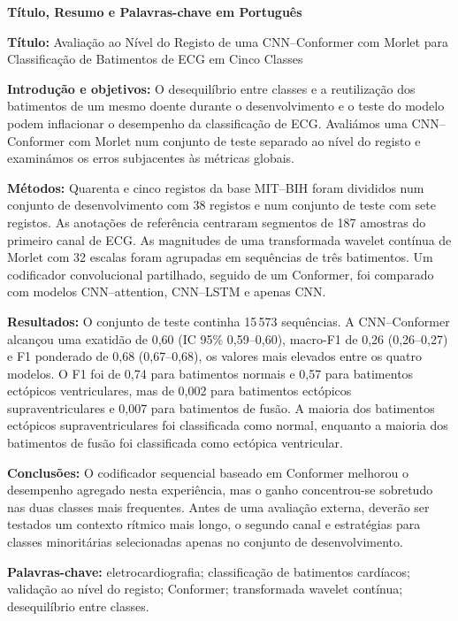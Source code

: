 \documentclass[11pt,a4paper]{article}
\begin{document}
\begin{center}
  \textbf{\Large Título, Resumo e Palavras-chave em Português}
\end{center}

\textbf{Título:} Avaliação ao Nível do Registo de uma CNN--Conformer com Morlet para Classificação de Batimentos de ECG em Cinco Classes

\textbf{Introdução e objetivos:} O desequilíbrio entre classes e a reutilização dos batimentos de um mesmo doente durante o desenvolvimento e o teste do modelo podem inflacionar o desempenho da classificação de ECG. Avaliámos uma CNN--Conformer com Morlet num conjunto de teste separado ao nível do registo e examinámos os erros subjacentes às métricas globais.

\textbf{Métodos:} Quarenta e cinco registos da base MIT--BIH foram divididos num conjunto de desenvolvimento com 38 registos e num conjunto de teste com sete registos. As anotações de referência centraram segmentos de 187 amostras do primeiro canal de ECG. As magnitudes de uma transformada wavelet contínua de Morlet com 32 escalas foram agrupadas em sequências de três batimentos. Um codificador convolucional partilhado, seguido de um Conformer, foi comparado com modelos CNN--attention, CNN--LSTM e apenas CNN.

\textbf{Resultados:} O conjunto de teste continha 15\,573 sequências. A CNN--Conformer alcançou uma exatidão de 0,60 (IC 95\% 0,59--0,60), macro-F1 de 0,26 (0,26--0,27) e F1 ponderado de 0,68 (0,67--0,68), os valores mais elevados entre os quatro modelos. O F1 foi de 0,74 para batimentos normais e 0,57 para batimentos ectópicos ventriculares, mas de 0,002 para batimentos ectópicos supraventriculares e 0,007 para batimentos de fusão. A maioria dos batimentos ectópicos supraventriculares foi classificada como normal, enquanto a maioria dos batimentos de fusão foi classificada como ectópica ventricular.

\textbf{Conclusões:} O codificador sequencial baseado em Conformer melhorou o desempenho agregado nesta experiência, mas o ganho concentrou-se sobretudo nas duas classes mais frequentes. Antes de uma avaliação externa, deverão ser testados um contexto rítmico mais longo, o segundo canal e estratégias para classes minoritárias selecionadas apenas no conjunto de desenvolvimento.

\textbf{Palavras-chave:} eletrocardiografia; classificação de batimentos cardíacos; validação ao nível do registo; Conformer; transformada wavelet contínua; desequilíbrio entre classes.
\end{document}
